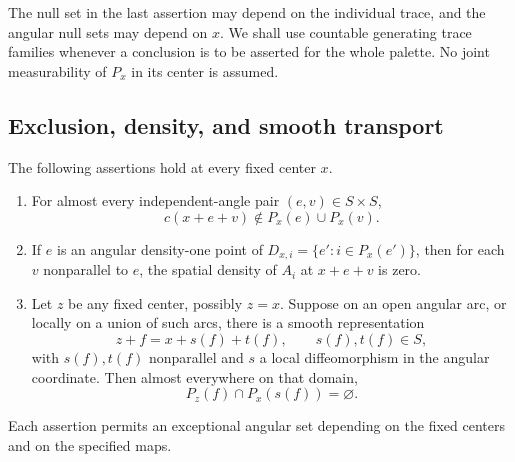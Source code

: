 The null set in the last assertion may depend on the individual
trace, and the angular null sets may depend on \(x\).  We shall use
countable generating trace families whenever a conclusion is to be
asserted for the whole palette.  No joint measurability of \(P_x\)
in its center is assumed.

\subsection{Exclusion, density, and smooth transport}

\begin{lemma}\label{lem:palette-transfer}
The following assertions hold at every fixed center \(x\).

\begin{enumerate}
\item For almost every independent-angle pair \((e,v)\in S\times S\),
\begin{equation}\label{eq:source-10}
 c(x+e+v)\notin P_x(e)\cup P_x(v).
\end{equation}

\item If \(e\) is an angular density-one point of
\(D_{x,i}=\{e':i\in P_x(e')\}\), then for each \(v\) nonparallel
to \(e\), the spatial density of \(A_i\) at \(x+e+v\) is zero.

\item Let \(z\) be any fixed center, possibly \(z=x\).  Suppose on an open angular
arc, or locally on a union of such arcs, there is a smooth representation
\[
 z+f=x+s(f)+t(f),\qquad s(f),t(f)\in S,
\]
with \(s(f),t(f)\) nonparallel and \(s\) a local diffeomorphism in
the angular coordinate.  Then almost everywhere on that domain,
\begin{equation}\label{eq:source-11}
 P_z(f)\cap P_x(s(f))=\varnothing.
\end{equation}
\end{enumerate}
Each assertion permits an exceptional angular set depending on the
fixed centers and on the specified maps.
\end{lemma}

